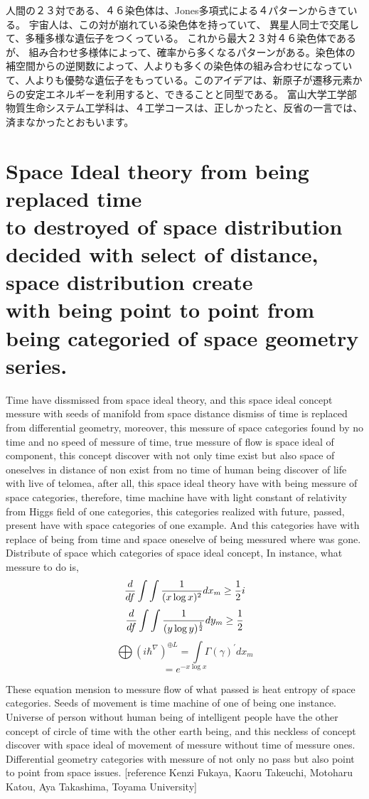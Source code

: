\documentclass{jsarticle}
\begin{document}
人間の２３対である、４６染色体は、Jones多項式による４パターンからきている。
宇宙人は、この対が崩れている染色体を持っていて、
異星人同士で交尾して、多種多様な遺伝子をつくっている。
これから最大２３対４６染色体であるが、
組み合わせ多様体によって、確率から多くなるパターンがある。染色体の補空間からの逆関数によって、人よりも多くの染色体の組み合わせになっていて、人よりも優勢な遺伝子をもっている。このアイデアは、新原子が遷移元素からの安定エネルギーを利用すると、できることと同型である。
富山大学工学部物質生命システム工学科は、４工学コースは、正しかったと、反省の一言では、済まなかったとおもいます。

\section{Space Ideal theory from being replaced time \\
to destroyed of space distribution \\
decided with select of distance, space distribution create \\
with being point to point from \\
being categoried of space geometry series.}

   Time have dissmissed from space ideal theory, and this space ideal concept messure with
seeds of manifold from space distance dismiss of time is replaced from differential geometry,
moreover, this messure of space categories found by no time and no speed of messure of time,
true messure of flow is space ideal of component, this concept discover with not only time exist
but also space of oneselves in distance of non exist from no time of human being discover of life
with live of telomea, after all, this space ideal theory have with being messure of space categories,
therefore, time machine have with light constant of relativity from Higgs field of one categories,
this categories realized with future, passed, present have with space categories of one example.
And this categories have with replace of being from time and space oneselve of being messured where
was gone.
Distribute of space which categories of space ideal concept,
In instance, what messure to do is,
$$ {d \over df}\int \int{1 \over {(x \log x)^2}}dx_m \ge {1 \over 2}i $$
$$ {d \over df}\int \int{1 \over {(y \log y)^{1 \over 2}}}dy_m \ge {1 \over 2} $$
$$ \bigoplus{(i \hbar^{\nabla})}^{\oplus L} = \int \Gamma(\gamma)^{'}dx_m $$
$$ = e^{-x \log x} $$


    These equation mension to messure flow of what passed is heat entropy of space categories.
Seeds of movement is time machine of one of being one instance.
Universe of person without human being of intelligent people have the other concept of
circle of time with the other earth being, and this neckless of concept discover with
space ideal of movement of messure without time of messure ones.
Differential geometry categories with messure of not only no pass but also point to point from space issues.
[reference Kenzi Fukaya, Kaoru Takeuchi, Motoharu Katou, Aya Takashima, Toyama University]
\end{document}
